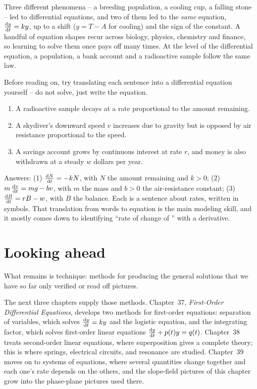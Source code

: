 \begin{aestheticbox}
Three different phenomena -- a breeding population, a cooling cup, a falling stone -- led to differential equations, and two of them led to the \emph{same} equation, $\frac{\mathrm{d} y}{\mathrm{d} t} = ky$, up to a shift ($y=T-A$ for cooling) and the sign of the constant. A handful of equation shapes recur across biology, physics, chemistry and finance, so learning to solve them once pays off many times. At the level of the differential equation, a population, a bank account and a radioactive sample follow the same law.
\end{aestheticbox}

\begin{labbox}
Before reading on, try translating each sentence into a differential equation yourself -- do not solve, just write the equation.
\begin{enumerate}
  \item A radioactive sample decays at a rate proportional to the amount remaining.
  \item A skydiver's downward speed $v$ increases due to gravity but is opposed by air resistance proportional to the speed.
  \item A savings account grows by continuous interest at rate $r$, and money is also withdrawn at a steady $w$ dollars per year.
\end{enumerate}
Answers: (1) $\frac{\mathrm{d} N}{\mathrm{d} t} = -kN$, with $N$ the amount remaining and $k>0$; (2) $m\,\frac{\mathrm{d} v}{\mathrm{d} t} = mg - bv$, with $m$ the mass and $b>0$ the air-resistance constant; (3) $\frac{\mathrm{d} B}{\mathrm{d} t} = rB - w$, with $B$ the balance. Each is a sentence about rates, written in symbols. That translation from words to equation is the main modeling skill, and it mostly comes down to identifying ``rate of change of \underline{\hspace{1.5em}}'' with a derivative.
\end{labbox}

\section{Looking ahead}
\label{ch36:sec-ahead}

What remains is technique: methods for producing the general solutions that we have so far only verified or read off pictures.

The next three chapters supply those methods. Chapter~37, \emph{First-Order Differential Equations}, develops two methods for first-order equations: separation of variables, which solves $\frac{\mathrm{d} y}{\mathrm{d} t}=ky$ and the logistic equation, and the integrating factor, which solves first-order linear equations $\frac{\mathrm{d} y}{\mathrm{d} t}+p(t)y=q(t)$. Chapter~38 treats second-order linear equations, where superposition gives a complete theory; this is where springs, electrical circuits, and resonance are studied. Chapter~39 moves on to systems of equations, where several quantities change together and each one's rate depends on the others, and the slope-field pictures of this chapter grow into the phase-plane pictures used there.

